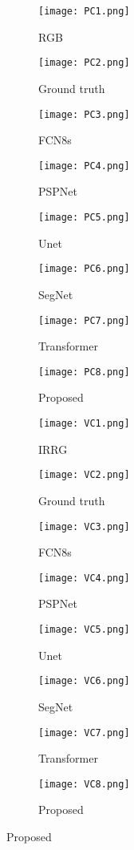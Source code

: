 \documentclass[journal]{IEEEtran}
\begin{document}
\begin{figure}[hptb]
\begin{subfigure}{.11\textwidth}
   \texttt{[image: PC1.png]}
   \caption{RGB}
\end{subfigure}\hfill
\begin{subfigure}{.11\textwidth}
   \texttt{[image: PC2.png]}
   \caption{Ground truth}
\end{subfigure}
\hfill
\begin{subfigure}{.11\textwidth}
   \texttt{[image: PC3.png]}
   \caption{FCN8s}
\end{subfigure}
\hfill
\begin{subfigure}{.11\textwidth}
   \texttt{[image: PC4.png]}
   \caption{PSPNet}
\end{subfigure}
\vfill
\begin{subfigure}{.11\textwidth}
   \texttt{[image: PC5.png]}
   \caption{Unet}
\end{subfigure}
\hfill
\begin{subfigure}{.11\textwidth}
   \texttt{[image: PC6.png]}
   \caption{SegNet}
\end{subfigure}
\hfill
\begin{subfigure}{.11\textwidth}
   \texttt{[image: PC7.png]}
   \caption{Transformer}
\end{subfigure}
\hfill
\begin{subfigure}{.11\textwidth}
   \texttt{[image: PC8.png]}
   \caption{Proposed}
\end{subfigure}
\vfill
\begin{subfigure}{.11\textwidth}
   \texttt{[image: VC1.png]}
   \caption{IRRG}
\end{subfigure}\hfill
\begin{subfigure}{.11\textwidth}
   \texttt{[image: VC2.png]}
   \caption{Ground truth}
\end{subfigure}
\hfill
\begin{subfigure}{.11\textwidth}
   \texttt{[image: VC3.png]}
   \caption{FCN8s}
\end{subfigure}
\hfill
\begin{subfigure}{.11\textwidth}
   \texttt{[image: VC4.png]}
   \caption{PSPNet}
\end{subfigure}
\vfill
\begin{subfigure}{.11\textwidth}
   \texttt{[image: VC5.png]}
   \caption{Unet}
\end{subfigure}
\hfill
\begin{subfigure}{.11\textwidth}
   \texttt{[image: VC6.png]}
   \caption{SegNet}
\end{subfigure}
\hfill
\begin{subfigure}{.11\textwidth}
   \texttt{[image: VC7.png]}
   \caption{Transformer}
\end{subfigure}
\hfill
\begin{subfigure}{.11\textwidth}
   \texttt{[image: VC8.png]}
   \caption{Proposed}
\end{subfigure}


\end{figure}
\end{document}
